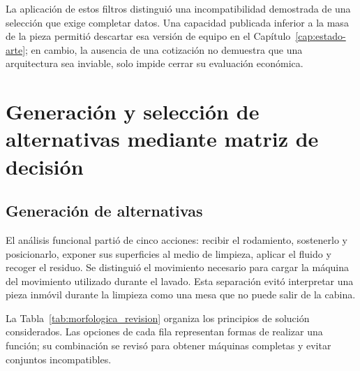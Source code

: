 La aplicación de estos filtros distinguió una incompatibilidad demostrada de una selección que exige completar datos. Una capacidad publicada inferior a la masa de la pieza permitió descartar esa versión de equipo en el Capítulo~\ref{cap:estado-arte}; en cambio, la ausencia de una cotización no demuestra que una arquitectura sea inviable, solo impide cerrar su evaluación económica.

\section{Generación y selección de alternativas mediante matriz de decisión}

\subsection{Generación de alternativas}

El análisis funcional partió de cinco acciones: recibir el rodamiento, sostenerlo y posicionarlo, exponer sus superficies al medio de limpieza, aplicar el fluido y recoger el residuo. Se distinguió el movimiento necesario para cargar la máquina del movimiento utilizado durante el lavado. Esta separación evitó interpretar una pieza inmóvil durante la limpieza como una mesa que no puede salir de la cabina.

La Tabla~\ref{tab:morfologica_revision} organiza los principios de solución considerados. Las opciones de cada fila representan formas de realizar una función; su combinación se revisó para obtener máquinas completas y evitar conjuntos incompatibles.

